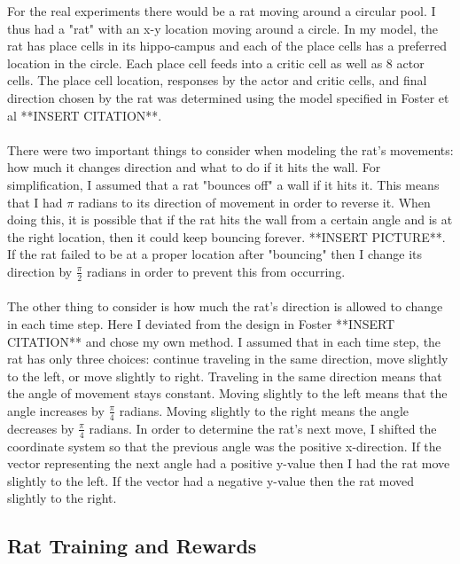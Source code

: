 \documentclass[conference]{IEEEtran}
\begin{document}
For the real experiments there would be a rat moving around a circular pool. I thus had a "rat" with an x-y location moving around a circle. In my model, the rat has place cells in its hippo-campus and each of the place cells has a preferred location in the circle. Each place cell feeds into a critic cell as well as 8 actor cells. The place cell location, responses by the actor and critic cells, and final direction chosen by the rat was determined using the model specified in Foster et al **INSERT CITATION**. \\
\\
There were two important things to consider when modeling the rat's movements: how much it changes direction and what to do if it hits the wall. For simplification, I assumed that a rat "bounces off" a wall if it hits it. This means that I had $\pi$ radians to its direction of movement in order to reverse it. When doing this, it is possible that if the rat hits the wall from a certain angle and is at the right location, then it could keep bouncing forever. **INSERT PICTURE**. If the rat failed to be at a proper location after "bouncing" then I change its direction by $\frac{\pi}{2}$ radians in order to prevent this from occurring. \\
\\
The other thing to consider is how much the rat's direction is allowed to change in each time step. Here I deviated from the design in Foster **INSERT CITATION** and chose my own method. I assumed that in each time step, the rat has only three choices: continue traveling in the same direction, move slightly to the left, or move slightly to right. Traveling in the same direction means that the angle of movement stays constant. Moving slightly to the left means that the angle increases by $\frac{\pi}{4}$ radians. Moving slightly to the right means the angle decreases by $\frac{\pi}{4}$ radians. In order to determine the rat's next move, I shifted the coordinate system so that the previous angle was the positive x-direction. If the vector representing the next angle had a positive y-value then I had the rat move slightly to the left. If the vector had a negative y-value then the rat moved slightly to the right.

\subsection{Rat Training and Rewards}
\end{document}
